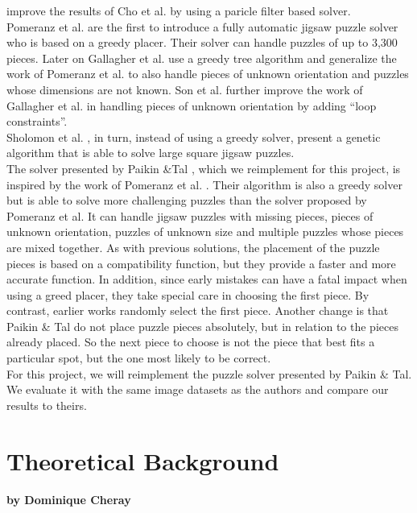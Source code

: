 \documentclass[11pt]{report}
\begin{document}
\cite{yang2011particle} improve the results of Cho et al. by using a paricle filter
based solver. \\
Pomeranz et al. \cite{Pomeranz2011} are the first to introduce a fully
automatic jigsaw puzzle solver who is based on a greedy placer. Their solver
can handle puzzles of up to 3,300 pieces. Later on Gallagher et al.
\cite{gallagher2012jigsaw} use a greedy tree algorithm and generalize the work
of Pomeranz et al. to also handle pieces of unknown orientation and puzzles
whose dimensions are not known. Son et al. \cite{son2014solving} further
improve the work of Gallagher et al. in handling pieces of unknown orientation
by adding ``loop constraints''. \\
Sholomon et al. \cite{sholomon2013genetic}, in turn, instead of using a greedy
solver, present a genetic algorithm that is able to solve large square jigsaw
puzzles. \\
The solver presented by Paikin \&Tal \cite{Paikin2015}, which we reimplement for
this project, is inspired by the work of Pomeranz et al. \cite{Pomeranz2011}.
Their algorithm is also a greedy solver but is able to solve more challenging
puzzles than the solver proposed by Pomeranz et al. It can handle jigsaw puzzles with
missing pieces, pieces of unknown orientation, puzzles of unknown size and
multiple puzzles whose pieces are mixed together. As with previous solutions,
the placement of the puzzle pieces is based on a compatibility function, but
they provide a faster and more accurate function. In addition, since early
mistakes can have a fatal impact when using a greed placer, they take special
care in choosing the first piece. By contrast, earlier works randomly select the
first piece. Another change is that Paikin \& Tal do not place puzzle pieces
absolutely, but in relation to the pieces already placed. So the next piece to
choose is not the piece that best fits a particular spot, but the one most
likely to be correct.\\
For this project, we will reimplement the puzzle solver presented by
Paikin \& Tal. We evaluate it with the same image datasets as the authors and
compare our results to theirs.


\chapter{Theoretical Background}
\subsubsection*{by Dominique Cheray}
\end{document}
